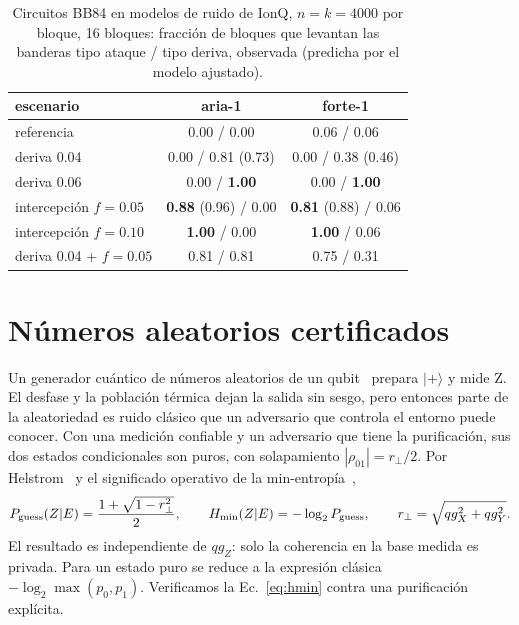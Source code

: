 \documentclass[11pt]{article}
\newcommand{\qgZ}{qg_Z}
\newcommand{\qgX}{qg_X}
\newcommand{\qgY}{qg_Y}
\begin{document}
\begin{table}[t]
\centering\small
\caption{Circuitos BB84 en modelos de ruido de IonQ, $n=k=4000$ por bloque, 16 bloques: fracción de bloques
que levantan las banderas tipo ataque / tipo deriva, observada (predicha por el modelo ajustado).}
\label{tab:ionqbb84}
\begin{tabular}{lcc}
\toprule
escenario & aria-1 & forte-1\\
\midrule
referencia & 0.00 / 0.00 & 0.06 / 0.06\\
deriva 0.04 & 0.00 / 0.81 (0.73) & 0.00 / 0.38 (0.46)\\
deriva 0.06 & 0.00 / \textbf{1.00} & 0.00 / \textbf{1.00}\\
intercepción $f=0.05$ & \textbf{0.88} (0.96) / 0.00 & \textbf{0.81} (0.88) / 0.06\\
intercepción $f=0.10$ & \textbf{1.00} / 0.00 & \textbf{1.00} / 0.06\\
deriva 0.04 + $f=0.05$ & 0.81 / 0.81 & 0.75 / 0.31\\
\bottomrule
\end{tabular}
\end{table}

\section{Números aleatorios certificados}\label{sec:qrng}

Un generador cuántico de números aleatorios de un qubit~\cite{herrero2017} prepara $|+\rangle$ y mide Z. El
desfase y la población térmica dejan la salida sin sesgo, pero entonces parte de la aleatoriedad es ruido
clásico que un adversario que controla el entorno puede conocer. Con una medición confiable y un adversario
que tiene la purificación, sus dos estados condicionales son puros, con solapamiento
$|\rho_{01}|=r_\perp/2$. Por Helstrom~\cite{helstrom1976} y el significado operativo de la
min-entropía~\cite{konig2009},
\begin{equation}\label{eq:hmin}
P_{\rm guess}(Z|E)=\frac{1+\sqrt{1-r_\perp^2}}{2},\qquad
H_{\min}(Z|E)=-\log_2P_{\rm guess},\qquad r_\perp=\sqrt{\qgX^2+\qgY^2}.
\end{equation}
El resultado es independiente de $\qgZ$: solo la coherencia en la base medida es privada. Para un estado
puro se reduce a la expresión clásica $-\log_2\max(p_0,p_1)$. Verificamos la Ec.~\eqref{eq:hmin} contra
una purificación explícita.
\end{document}

